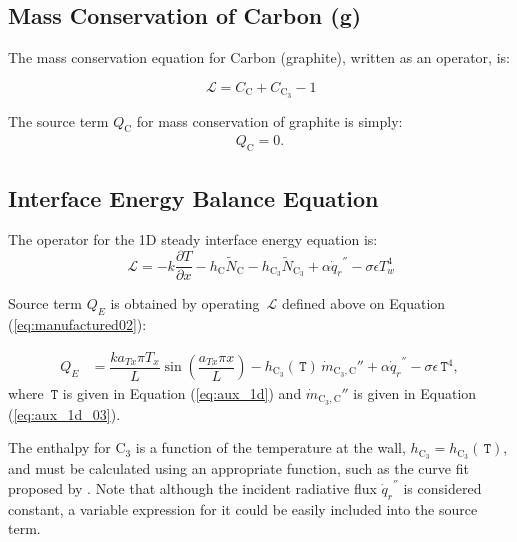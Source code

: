 \documentclass[10pt]{article}
\newcommand{\diff}[2] {\dfrac{\partial #1 }{\partial #2}}
\newcommand{\Lo}{\,\mathcal{L}}
\newcommand{\T}{\,\mathtt{T}}
\newcommand{\C}{\text{C}}
\begin{document}
\subsection{Mass Conservation of Carbon \C(g)}

The mass conservation equation for Carbon (graphite), written as an operator, is:

\begin{equation*}
 \Lo = C_\C+C_{\C_3} - 1
\end{equation*}

The source term $Q_\C $ for mass conservation of graphite is simply:
\begin{equation}
\begin{split}
Q_\C =0.
\end{split}
\end{equation}


\subsection{Interface Energy Balance Equation}

The operator for the 1D steady interface energy equation is:
\begin{equation*}
\Lo=-k \diff{T}{x}-h_\C \tilde{N}_\C - h_{\C_3} \tilde{N}_{\C_3}+ \alpha  {\dot{q}_r}^{''}-\sigma \epsilon T_w^4 
\end{equation*}

Source term $Q_{E}$ is obtained by operating $\Lo$ defined above on Equation  (\ref{eq:manufactured02}):

\begin{equation}
 \begin{split}
  Q_E &= \dfrac{k a_{Tx} \pi T_x}{L} \sin\left(\dfrac{a_{Tx} \pi x}{L}\right)  - h_{\C_3}(\T)\, \dot{m}_{\C_3,\C}''  +\alpha  {\dot{q}_r}^{''}-\sigma \epsilon \T^4 ,
 \end{split}
\end{equation}
where $\T$ is given in Equation (\ref{eq:aux_1d}) and $\dot{m}_{\C_3,\C}''$ is given in Equation (\ref{eq:aux_1d_03}). 


The enthalpy for $\C_3$ is a function of the temperature at the wall, $ h_{\C_3}=h_{\C_3}(\T)$, and must be calculated using an appropriate function, such as the curve fit proposed by \citet{Nasa_chemistry}. 
Note that although the incident radiative flux $ {\dot{q}_r}^{''}$ is considered constant, a variable expression for it could be easily included into the source term.
\end{document}
